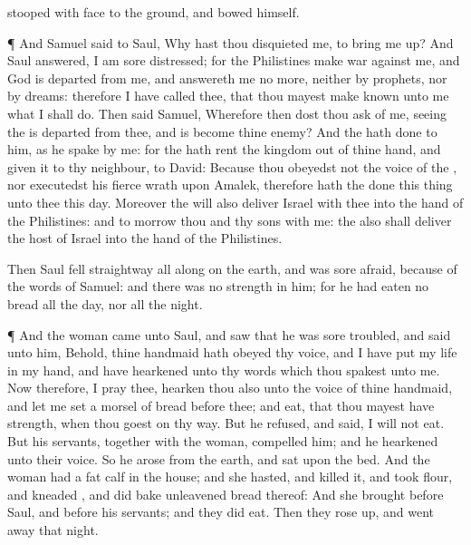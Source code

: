 {stooped with
{}
face to the
ground, and
bowed himself.
\par }{\PP {}¶ And
Samuel
said to
Saul, Why hast thou
disquieted me, to bring me
up? And
Saul
answered, I am
sore
distressed; for the
Philistines make
war against me, and
God is
departed from me, and
answereth me no more, neither
by
prophets, nor by
dreams: therefore I have
called thee, that thou mayest make
known unto me what I shall
do.
Then
said
Samuel, Wherefore then dost thou
ask of me, seeing the
{} is
departed from thee, and is become thine
enemy?
And the
{} hath
done to him, as he
spake by
me: for the
{} hath
rent the
kingdom out of thine
hand, and
given it to thy
neighbour,
{} to
David:
Because thou
obeyedst not the
voice of the
{}, nor
executedst his
fierce
wrath upon
Amalek, therefore hath the
{}
done this
thing unto thee this
day.
Moreover the
{} will also
deliver
Israel with thee into the
hand of the
Philistines: and to
morrow
{} thou and thy
sons
{} with me: the
{} also shall
deliver the
host of
Israel into the
hand of the
Philistines.
\par }{\PP {}Then
Saul
fell
straightway
all
along on the
earth, and was
sore
afraid, because of the
words of
Samuel: and there was no
strength in him; for he had
eaten no
bread all the
day, nor all the
night.
\par }{\PP {}¶ And the
woman
came unto
Saul, and
saw that he was
sore
troubled, and
said unto him, Behold, thine
handmaid hath
obeyed thy
voice, and I have
put my
life in my
hand, and have
hearkened unto thy
words which thou
spakest unto me.
Now therefore, I pray thee,
hearken thou also unto the
voice of thine
handmaid, and let me
set a
morsel of
bread
before thee; and
eat, that thou mayest have
strength, when thou
goest on thy
way.
But he
refused, and
said, I will not
eat. But his
servants, together with the
woman,
compelled him; and he
hearkened unto their
voice. So he
arose from the
earth, and
sat upon the
bed.
And the
woman had a
fat
calf in the
house; and she
hasted, and
killed it, and
took
flour, and
kneaded
{}, and did
bake unleavened
bread thereof:
And she
brought
{}
before
Saul, and
before his
servants; and they did
eat. Then they rose
up, and went
away that
night.

}
